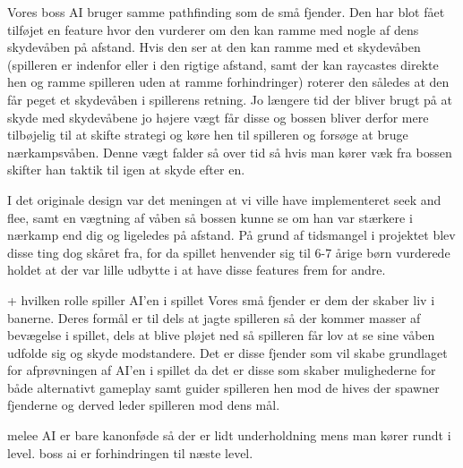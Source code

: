 Vores boss AI bruger samme pathfinding som de små fjender. Den har blot fået tilføjet en feature hvor den vurderer om den kan ramme med nogle af dens skydevåben på afstand. Hvis den ser at den kan ramme med et skydevåben (spilleren er indenfor eller i den rigtige afstand, samt der kan raycastes direkte hen og ramme spilleren uden at ramme forhindringer) roterer den således at den får peget et skydevåben i spillerens retning. Jo længere tid der bliver brugt på at skyde med skydevåbene jo højere vægt får disse og bossen bliver derfor mere tilbøjelig til at skifte strategi og køre hen til spilleren og forsøge at bruge nærkampsvåben. Denne vægt falder så over tid så hvis man kører væk fra bossen skifter han taktik til igen at skyde efter en.

I det originale design var det meningen at vi ville have implementeret seek and flee, samt en vægtning af våben så bossen kunne se om han var stærkere i nærkamp end dig og ligeledes på afstand. På grund af tidsmangel i projektet blev disse ting dog skåret fra, for da spillet henvender sig til 6-7 årige børn vurderede holdet at der var lille udbytte i at have disse features frem for andre.


                + hvilken rolle spiller AI’en i spillet
Vores små fjender er dem der skaber liv i banerne. Deres formål er til dels at jagte spilleren så der kommer masser af bevægelse i spillet, dels at blive pløjet ned så spilleren får lov at se sine våben udfolde sig og skyde modstandere. Det er disse fjender som vil skabe grundlaget for afprøvningen af AI'en i spillet da det er disse som skaber mulighederne for både alternativt gameplay samt guider spilleren hen mod de hives der spawner fjenderne og derved leder spilleren mod dens mål.


melee AI er bare kanonføde så der er lidt underholdning mens man kører rundt i level.
boss ai er forhindringen til næste level.
